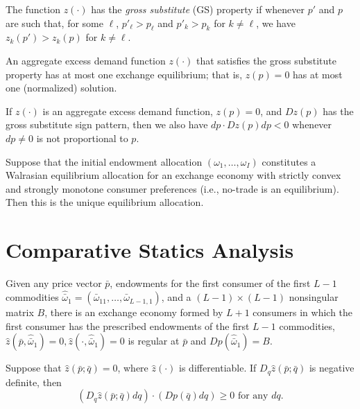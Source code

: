 \begin{defn}
    The function $z(\cdot)$ has the \emph{gross substitute} (GS) property if whenever $p'$ and $p$ are such that, for some $\ell$, $p'_\ell > p_\ell$ and $p'_k > p_k$ for $k \neq \ell$, we have $z_k(p') > z_k(p)$ for $k \neq \ell$.
\end{defn}

\begin{prop}
    An aggregate excess demand function $z(\cdot)$ that satisfies the gross substitute property has at most one exchange equilibrium; that is, $z(p) = 0$ has at most one (normalized) solution.
\end{prop}

\begin{prop}
    If $z(\cdot)$ is an aggregate excess demand function, $z(p) = 0$, and $Dz(p)$ has the gross substitute sign pattern, then we also have $dp \cdot Dz(p) dp < 0$ whenever $dp \neq 0$ is not proportional to $p$.
\end{prop}

\begin{prop}
    Suppose that the initial endowment allocation $(\omega_1, \dots, \omega_I)$ constitutes a Walrasian equilibrium allocation for an exchange economy with strictly convex and strongly monotone consumer preferences (i.e., no-trade is an equilibrium). Then this is the unique equilibrium allocation.
\end{prop}


\section{Comparative Statics Analysis}

\begin{prop}
    Given any price vector $\bar{p}$, endowments for the first consumer of the first $L - 1$ commodities $\hat{\bar{\omega}}_1 = (\bar{\omega}_{11}, \dots, \bar{\omega}_{L - 1, 1})$, and a $(L - 1) \times (L - 1)$ nonsingular matrix $B$, there is an exchange economy formed by $L + 1$ consumers in which the first consumer has the prescribed endowments of the first $L - 1$ commodities, $\hat{z}(\bar{p}, \hat{\bar{\omega}}_1) = 0, \hat{z}(\cdot, \hat{\bar{\omega}}_1) = 0$ is regular at $\bar{p}$ and $D p(\hat{\bar{\omega}}_1) = B$.
\end{prop}

\begin{prop}
    Suppose that $\hat{z} (\bar{p}; \bar{q}) = 0$, where $\hat{z}(\cdot)$ is differentiable. If $D_q \hat{z} (\bar{p}; \bar{q})$ is negative definite, then
    \begin{equation*}
        \left( D_q \hat{z} (\bar{p}; \bar{q}) dq \right) \cdot \left( D p(\bar{q}) dq \right) \geq 0 \text{ for any } dq.
    \end{equation*}
\end{prop}


